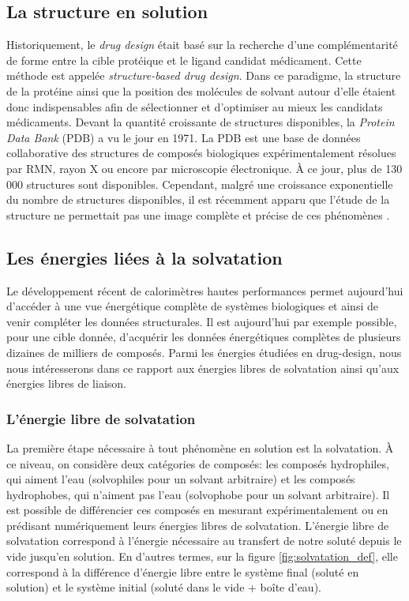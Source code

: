 \subsection{La structure en solution}
Historiquement, le \textit{drug design} était basé sur la recherche d'une complémentarité de forme entre la cible protéique et le ligand candidat médicament. Cette méthode est appelée \textit{structure-based drug design}\cite{Anderson_process_2003,Zhang_towards_2011,Agrawal_structure_2013}. Dans ce paradigme, la structure de la protéine ainsi que la position des molécules de solvant autour d'elle étaient donc indispensables afin de sélectionner et d'optimiser au mieux les candidats médicaments. Devant la quantité croissante de structures disponibles, la \textit{Protein Data Bank}\cite{Bruno_crystallography_2017, Berman_protein_2000} (PDB) a vu le jour en 1971. La PDB est une base de données collaborative des structures de composés biologiques expérimentalement résolues par RMN\cite{Montelione_recommendations_2013}, rayon X\cite{Read_new_2011} ou encore par microscopie électronique\cite{Henderson_outcome_2012}. À ce jour, plus de 130 000 structures sont disponibles. Cependant, malgré une croissance exponentielle du nombre de structures disponibles, il est récemment apparu que l'étude de la structure ne permettait pas une image complète et précise de ces phénomènes \cite{Henry_structure_2001}. 


\subsection{Les énergies liées à la solvatation}
Le développement récent de calorimètres hautes performances permet aujourd'hui d'accéder à une vue énergétique complète de systèmes biologiques\cite{Chaires_Calorimetry_2008, Garbett_thermodynamic_2012, Klebe_applying_2015} et ainsi de venir compléter les données structurales. Il est aujourd'hui par exemple possible, pour une cible donnée, d'acquérir les données énergétiques complètes de plusieurs dizaines de milliers de composés. Parmi les énergies étudiées en drug-design, nous nous intéresserons dans ce rapport aux énergies libres de solvatation ainsi qu'aux énergies libres de liaison.

\subsubsection{L'énergie libre de solvatation}
La première étape nécessaire à tout phénomène en solution est la solvatation. À ce niveau, on considère deux catégories de composés: les composés hydrophiles, qui aiment l'eau (solvophiles pour un solvant arbitraire) et les composés hydrophobes, qui n'aiment pas l'eau (solvophobe pour un solvant arbitraire). Il est possible de différencier ces composés en mesurant expérimentalement ou en prédisant numériquement leurs énergies libres de solvatation. L'énergie libre de solvatation correspond à l'énergie nécessaire au transfert de notre soluté depuis le vide jusqu'en solution. En d'autres termes, sur la figure \ref{fig:solvatation_def}, elle correspond à la différence d'énergie libre entre le système final (soluté en solution) et le système initial (soluté dans le vide + boîte d'eau). 

